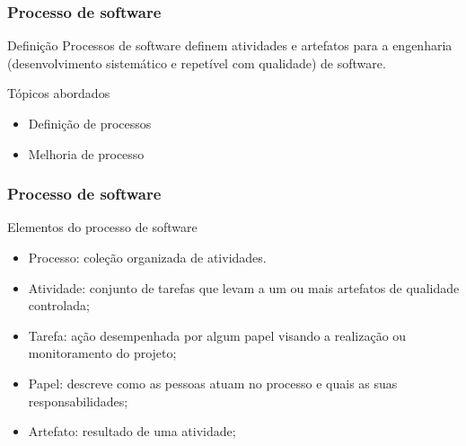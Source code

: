 \begin{frame}[parent={ie:agenda}, hasnext=true, hasprev=true]
	\frametitle{Processo de software}

	\begin{block:concept}{Definição}
		Processos de software definem atividades e artefatos para
		a engenharia (desenvolvimento sistemático e repetível com qualidade) de
		software.
	\end{block:concept}
	
	\begin{block:fact}{Tópicos abordados}
		\begin{itemize}
			\item Definição de processos
			\item Melhoria de processo
		\end{itemize}
	\end{block:fact}
\end{frame}



\begin{frame}[parent={ie:agenda}, hasnext=true, hasprev=true]
	\frametitle{Processo de software}
	
	\begin{block:concept}{Elementos do processo de software}
		\begin{itemize}
			\item Processo: coleção	organizada de atividades.
			\item Atividade: conjunto de tarefas que levam a um ou mais artefatos de	qualidade controlada;
			\item Tarefa: ação desempenhada por algum papel visando a realização ou
				monitoramento do projeto;
			\item Papel: descreve como as pessoas atuam no processo e quais as suas
				responsabilidades;
			\item Artefato: resultado de uma atividade;
		\end{itemize}
	\end{block:concept}
\end{frame}

